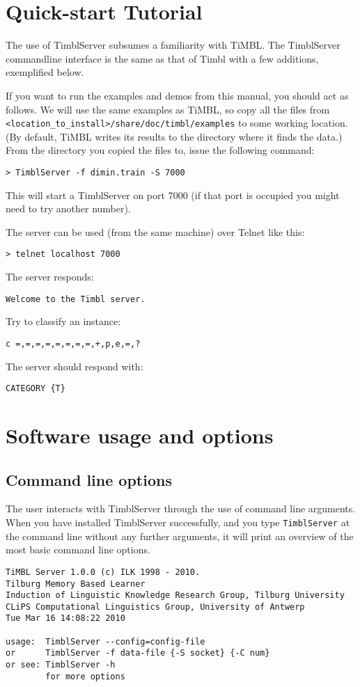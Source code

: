 \documentclass{report}
\begin{document}
\chapter{Quick-start Tutorial}
\label{tutorial}

The use of TimblServer subsumes a familiarity with TiMBL.  The
TimblServer commandline interface is the same as that of Timbl with a
few additions, exemplified below.

If you want to run the examples and demos from this manual, you should
act as follows. We will use the same examples as TiMBL, so copy all the files from {\tt
 <location\_to\_install>/share/doc/timbl/examples} to some working
location. (By default, TiMBL writes its results to the directory where
it finds the data.) From the directory you copied the files to, issue
the following command:

{\tt > TimblServer -f dimin.train -S 7000}

This will start a TimblServer on port 7000 (if that port is occupied you might need to try another number).

The server can be used (from the same machine) over Telnet like this:

{\tt > telnet localhost 7000 }

The server responds:

{\tt Welcome to the Timbl server.}

Try to classify an instance:

{\tt c =,=,=,=,=,=,=,=,+,p,e,=,? }

The server should respond with:

{\tt CATEGORY \{T\} }


\chapter{Software usage and options}
\label{reference}

\section{Command line options}
\label{commandline}

The user interacts with TimblServer through the use of command line
arguments.  When you have installed TimblServer successfully, and you
type {\tt TimblServer} at the command line without any further
arguments, it will print an overview of the most basic command line
options.

{\footnotesize
\begin{verbatim}
TiMBL Server 1.0.0 (c) ILK 1998 - 2010.
Tilburg Memory Based Learner
Induction of Linguistic Knowledge Research Group, Tilburg University
CLiPS Computational Linguistics Group, University of Antwerp
Tue Mar 16 14:08:22 2010

usage:  TimblServer --config=config-file
or      TimblServer -f data-file {-S socket} {-C num}
or see: TimblServer -h
        for more options
\end{verbatim}
}
\end{document}
